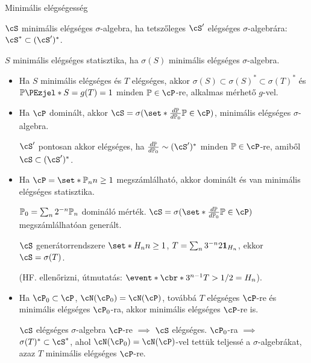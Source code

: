 \documentclass[aspectratio=169,notheorems,9pt,\option]{beamer}
\begin{document}
\begin{frame}{Minimális elégségesség}
  \begin{df}
    $\cS$ minimális elégséges $\sigma$-algebra, ha tetszőleges  
    $\cS'$ elégséges $\sigma$-algebrára: $\cS^*\subset (\cS')^*$.

    $S$ minimális elégséges statisztika, ha $\sigma(S)$ minimális elégséges $\sigma$-algebra.
  \end{df}
  \continue
  \begin{itemize}
    \item Ha $S$ minimális elégséges és $T$ elégséges, akkor $\sigma(S)\subset\sigma(S)^*\subset \sigma(T)^*$ 
    és $\P{S=g(T)}=1$ minden $\P\in\cP$-re, alkalmas mérhető $g$-vel.
    \item Ha $\cP$ dominált, akkor $\cS=\sigma(\set*{\frac{d\P}{d\P[0]}}{\P\in\cP})$,
    minimális elégséges $\sigma$-algebra.
    \pause

    $\cS'$ pontosan akkor elégséges, 
    ha $\frac{d\P}{d\P[0]}\sim(\cS')^*$ minden $\P\in\cP$-re, amiből $\cS\subset(\cS')^*$.

    \item Ha $\cP=\set*{\P[n]}{n\geq1}$ megszámlálható, %
    akkor  dominált és van minimális elégséges statisztika.
    \pause

    $\P[0]=\sum_n 2^{-n}\P[n]$ domináló mérték.
    $\cS=\sigma(\set*{\frac{d\P}{d\P[0]}}{\P\in\cP})$ megszámlálhatóan generált. 

    $\cS$ generátorrendszere $\set*{H_n}{n\geq1}$, $T=\sum_n 3^{-n} 2\I[H_n]$, ekkor 
    $\cS=\sigma(T)$.

    (HF. ellenőrizni, útmutatás: $\event*{\cbr*{3^{n-1} T}>1/2}=H_n$).

    \item Ha $\cP_0\subset\cP$, $\cN(\cP_0)=\cN(\cP)$, 
    továbbá $T$ elégséges $\cP$-re és minimális elégséges $\cP_0$-ra, akkor 
    minimális elégséges $\cP$-re is.
    \pause

    $\cS$ elégséges $\sigma$-algebra $\cP$-re $\implies$ $\cS$ elégséges. 
    $\cP_0$-ra $\implies$ $\sigma(T)^*\subset \cS^*$,
    ahol $\cN(\cP_0)=\cN(\cP)$-vel tettük teljessé a 
    $\sigma$-algebrákat, azaz $T$ minimális elégséges $\cP$-re.
  \end{itemize}
\end{frame}
\end{document}
